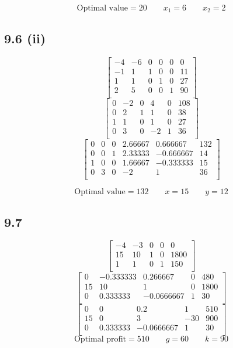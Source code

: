 \documentclass[letterpaper,12pt]{article}
\theoremstyle{definition}
\begin{document}
\[ \text{Optimal value} = 20 \qquad x_1 = 6 \qquad x_2 = 2\]

\subsection*{9.6 (ii)}
\[
\begin{bmatrix}
 -4 & -6 & 0 & 0 & 0 &  0 \\
 -1 &  1 & 1 & 0 & 0 & 11 \\
  1 &  1 & 0 & 1 & 0 & 27 \\
  2 &  5 & 0 & 0 & 1 & 90 \\
\end{bmatrix}
\]
\[
\begin{bmatrix}
 0 & -2 & 0 &  4 & 0 & 108 \\
 0 &  2 & 1 &  1 & 0 &  38 \\
 1 &  1 & 0 &  1 & 0 &  27 \\
 0 &  3 & 0 & -2 & 1 &  36 \\
\end{bmatrix}
\]
\[
\begin{bmatrix}
 0 & 0 & 0 &  2.66667 &  0.666667 & 132 \\
 0 & 0 & 1 &  2.33333 & -0.666667 &  14 \\
 1 & 0 & 0 &  1.66667 & -0.333333 &  15 \\
 0 & 3 & 0 & -2       &  1        &  36 \\
\end{bmatrix}
\]

\[ \text{Optimal value} = 132 \qquad x = 15 \qquad y = 12\]

\subsection*{9.7}
\[
\begin{bmatrix}
-4 & -3 & 0 & 0 &    0 \\
 15 & 10 & 1 & 0 & 1800 \\
  1 &  1 & 0 & 1 &  150 \\
\end{bmatrix}
\]
\[
\begin{bmatrix}
  0 & -0.333333 &  0.266667  & 0 &  480 \\
 15 & 10        &  1         & 0 & 1800 \\
  0 &  0.333333 & -0.0666667 & 1 &   30 \\
\end{bmatrix}
\]
\[
\begin{bmatrix}
  0 & 0        &  0.2       &   1 & 510 \\
 15 & 0        &  3         & -30 & 900 \\
  0 & 0.333333 & -0.0666667 &   1 &  30 \\
\end{bmatrix}
\]
\[ \text{Optimal profit} = 510 \qquad g = 60 \qquad k = 90\]
\end{document}
